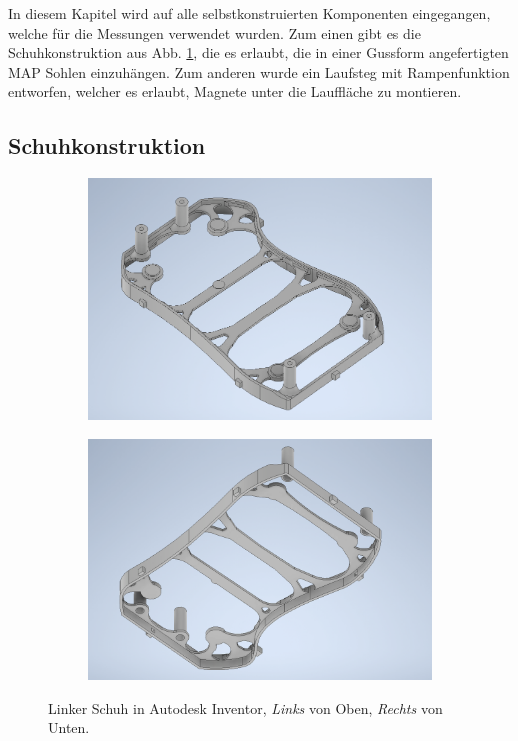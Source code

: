 In diesem Kapitel wird auf alle selbstkonstruierten Komponenten eingegangen, welche für die Messungen verwendet wurden. Zum einen gibt es die Schuhkonstruktion aus Abb. \ref{Schuh_Inventor}, die es erlaubt, die in einer Gussform angefertigten MAP Sohlen einzuhängen. Zum anderen wurde ein Laufsteg mit Rampenfunktion entworfen, welcher es erlaubt, Magnete unter die Lauffläche zu montieren. 

\subsection{Schuhkonstruktion} \label{Schuhkonstruktion}
\begin{figure}[tb]
	\hfill
	\begin{subfigure}[c]{.49\linewidth}
		\centering
		\includegraphics[width=\linewidth]{Bilder/Schuh_oben.png}
	\end{subfigure}
	\begin{subfigure}[c]{.49\linewidth}
		\centering
		\includegraphics[width=\linewidth]{Bilder/Schuh_unten.png}
	\end{subfigure}
	\hfill
	\caption{Linker Schuh in Autodesk Inventor, \textit{Links} von Oben, \textit{Rechts} von Unten.}
	\label{Schuh_Inventor}
\end{figure}
